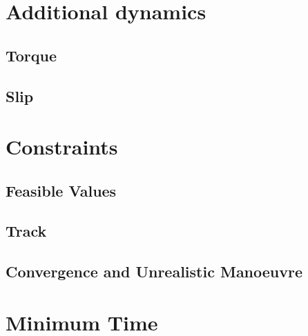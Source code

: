 \section{Additional dynamics}
%
\subsection{Torque}
%
\subsection{Slip}
%

\section{Constraints}
%
\subsection{Feasible Values}
%
\subsection{Track}
%
\subsection{Convergence and Unrealistic Manoeuvre}
%

\section{Minimum Time}
%
